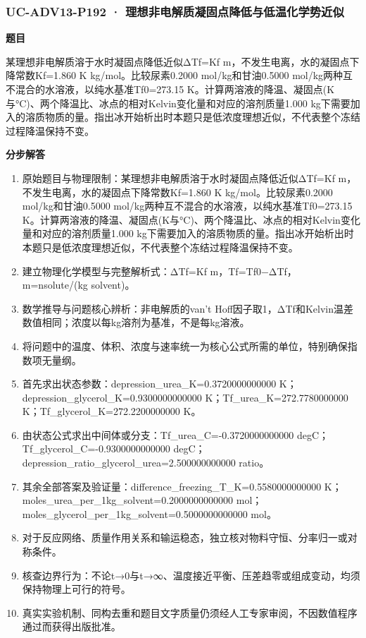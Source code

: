 \documentclass[UTF8,11pt,a4paper]{ctexart}
\begin{document}
\subsubsection*{UC-ADV13-P192 · 理想非电解质凝固点降低与低温化学势近似}
\noindent\textbf{题目}\par
某理想非电解质溶于水时凝固点降低近似ΔTf=Kf m，不发生电离，水的凝固点下降常数Kf=1.860 K kg/mol。比较尿素0.2000 mol/kg和甘油0.5000 mol/kg两种互不混合的水溶液，以纯水基准Tf0=273.15 K。计算两溶液的降温、凝固点(K与°C)、两个降温比、冰点的相对Kelvin变化量和对应的溶剂质量1.000 kg下需要加入的溶质物质的量。指出冰开始析出时本题只是低浓度理想近似，不代表整个冻结过程降温保持不变。\par
\medskip\noindent\textbf{分步解答}
\begin{enumerate}
\item 原始题目与物理限制：某理想非电解质溶于水时凝固点降低近似ΔTf=Kf m，不发生电离，水的凝固点下降常数Kf=1.860 K kg/mol。比较尿素0.2000 mol/kg和甘油0.5000 mol/kg两种互不混合的水溶液，以纯水基准Tf0=273.15 K。计算两溶液的降温、凝固点(K与°C)、两个降温比、冰点的相对Kelvin变化量和对应的溶剂质量1.000 kg下需要加入的溶质物质的量。指出冰开始析出时本题只是低浓度理想近似，不代表整个冻结过程降温保持不变。
\item 建立物理化学模型与完整解析式：ΔTf=Kf m，Tf=Tf0−ΔTf，m=nsolute/(kg solvent)。
\item 数学推导与问题核心辨析：非电解质的van't Hoff因子取1，ΔTf和Kelvin温差数值相同；浓度以每kg溶剂为基准，不是每kg溶液。
\item 将问题中的温度、体积、浓度与速率统一为核心公式所需的单位，特别确保指数项无量纲。
\item 首先求出状态参数：depression\_urea\_K=0.3720000000000 K；depression\_glycerol\_K=0.9300000000000 K；Tf\_urea\_K=272.7780000000 K；Tf\_glycerol\_K=272.2200000000 K。
\item 由状态公式求出中间体或分支：Tf\_urea\_C=-0.3720000000000 degC；Tf\_glycerol\_C=-0.9300000000000 degC；depression\_ratio\_glycerol\_urea=2.500000000000 ratio。
\item 其余全部答案及验证量：difference\_freezing\_T\_K=0.5580000000000 K；moles\_urea\_per\_1kg\_solvent=0.2000000000000 mol；moles\_glycerol\_per\_1kg\_solvent=0.5000000000000 mol。
\item 对于反应网络、质量作用关系和输运稳态，独立核对物料守恒、分率归一或对称条件。
\item 核查边界行为：不论t→0与t→∞、温度接近平衡、压差趋零或组成变动，均须保持物理上可行的符号。
\item 真实实验机制、同构去重和题目文字质量仍须经人工专家审阅，不因数值程序通过而获得出版批准。
\end{enumerate}
\end{document}
